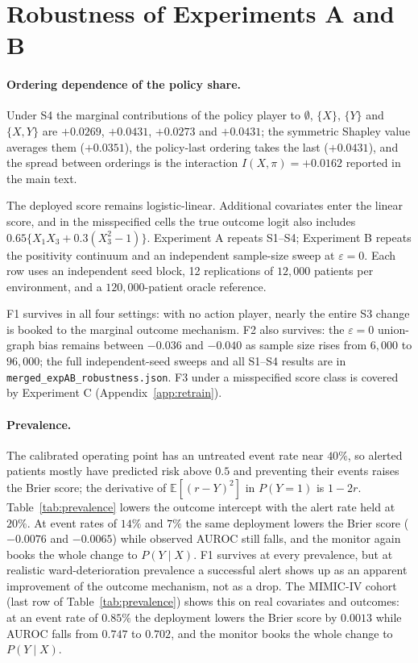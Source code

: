 \documentclass[letterpaper]{article} %
\newcommand{\E}{\mathbb{E}}
\begin{document}
\section{Robustness of Experiments A and B}
\label{app:robustness}
\paragraph{Ordering dependence of the policy share.} Under S4 the marginal
contributions of the policy player to $\emptyset$, $\{X\}$, $\{Y\}$ and
$\{X, Y\}$ are $+0.0269$, $+0.0431$, $+0.0273$ and $+0.0431$; the symmetric
Shapley value averages them ($+0.0351$), the policy-last ordering takes the
last ($+0.0431$), and the spread between orderings is the interaction
$I(X, \pi) = +0.0162$ reported in the main text.

The deployed score remains logistic-linear. Additional covariates enter the
linear score, and in the misspecified cells the true outcome logit also includes
$0.65\{X_1X_3+0.3(X_3^2-1)\}$. Experiment A repeats S1--S4; Experiment B
repeats the positivity continuum and an independent sample-size sweep at
$\varepsilon=0$. Each row uses an independent seed block, 12 replications of
$12{,}000$ patients per environment, and a $120{,}000$-patient oracle reference.


F1 survives in all four settings: with no action player, nearly the entire S3
change is booked to the marginal outcome mechanism. F2 also survives: the
$\varepsilon=0$ union-graph bias remains between $-0.036$ and $-0.040$ as
sample size rises from $6{,}000$ to $96{,}000$; the full independent-seed
sweeps and all S1--S4 results are in \texttt{merged\_expAB\_robustness.json}.
F3 under a misspecified score class is covered by Experiment C (Appendix~\ref{app:retrain}).

\paragraph{Prevalence.} The calibrated operating point has an untreated event
rate near $40\%$, so alerted patients mostly have predicted risk above $0.5$
and preventing their events raises the Brier score; the derivative of
$\E[(r - Y)^2]$ in $P(Y{=}1)$ is $1 - 2r$. Table~\ref{tab:prevalence} lowers
the outcome intercept with the alert rate held at $20\%$. At event rates of
$14\%$ and $7\%$ the same deployment lowers the Brier score ($-0.0076$ and
$-0.0065$) while observed AUROC still falls, and the monitor again books the
whole change to $P(Y \mid X)$. F1 survives at every prevalence, but at
realistic ward-deterioration prevalence a successful alert shows up as an
apparent improvement of the outcome mechanism, not as a drop. The MIMIC-IV
cohort (last row of Table~\ref{tab:prevalence}) shows this on real covariates
and outcomes: at an event rate of $0.85\%$ the deployment lowers the Brier
score by $0.0013$ while AUROC falls from $0.747$ to $0.702$, and the monitor
books the whole change to $P(Y \mid X)$.
\end{document}
